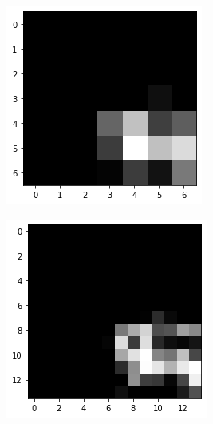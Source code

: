\documentclass[10pt,twocolumn,hidelinks,letterpaper]{article}
\begin{document}
\begin{figure}
\begin{subfigure}{.59\linewidth}
\begin{subfigure}{.325\linewidth}
  	\end{subfigure}
  	\begin{subfigure}{.325\linewidth}
  		\includegraphics[width=\linewidth]{images/mmaps_example/downsampling7x7_gray.png}
  	\end{subfigure}
  	\begin{subfigure}{.325\linewidth}
  		\includegraphics[width=\linewidth]{images/mmaps_example/downsampling14x14_gray.png}

\end{subfigure}
\end{subfigure}
\end{figure}
\end{document}
